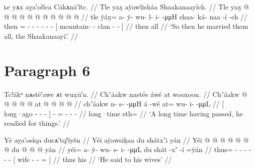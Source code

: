 \ex\label{ex:92-122-married-them-all}%
%
\begingl
	\glpreamble	ʟe yᴀx aỵa′ołîca Cākᴀnā′îtc. //
	\glpreamble	Tle yax̱ aÿawlisháa Shaakanaayích. //
	\gla	Tle yax̱ @  @ {} @ {} @ {} @ {} @ {} @ {}
		{}  @ {} @ {} @ {} @ {} {} //
	\glb	tle ÿáx̱= a- ÿ- wu- l- i-  -μμH
		{} shaa- ká- naa -í -ch {} //
	\glc	then = - - - - -
			 -
		{}[ mountain- - clan - - {}] //
	\gld	then all  {} {} {} {} {} {}
		{}  {} {} {} {} {} //
	\glft	‘So then he married them all, the Shaakanaayí.’
		//
\endgl
\xe

\section{Paragraph 6}\label{sec:92-para-6}

\ex\label{ex:92-123-ready-for-things}%
%
\begingl
	\glpreamble	Tc!ākᵘ nᴀstē′awe ᴀt wux̣ū′n. //
	\glpreamble	Chʼáakw nastée áwé at wooxoon. //
	\gla	{} Chʼáakw  @ {} @ {} @ {} @ {} {}  @ {}
		at @  @ {} @ {} @ {} //
	\glb	{} chʼáakw n- s-  -μμH {} {} á -wé
		at= wu- i-  -μμL //
	\glc	{}[ long·ago - -  - \· {}]
		 -
		= - -  - //
	\gld	{} long·time  {} {} {} {} {}
		 {} 
 		sth=  {} {} {} //
	\glft	‘A long time having passed, he readied for things.’
		//
\endgl
\xe


\ex\label{ex:92-124-said-to-wives}%
%
\begingl
	\glpreamble	Yē aỵa′osîqa ducᴀ′tq!îyên //
	\glpreamble	Yéi aÿawsiḵaa du shátxʼi yán //
	\gla	Yéi @  @ {} @ {} @ {} @ {} @ {} @ {}
		{} du  @ {} @ {} @ \•yán {} //
	\glb	yéi= a- ÿ- wu- s- i-  -μμL
		{} du shát -xʼ -í =ÿán {} //
	\glc	thus= - - - - -  -
		{}[  wife - - = {}] //
	\gld	thus  {} {} {} {} {} {}
		{} his  {} {} {} {} //
	\glft	‘He said to his wives’
		//
\endgl
\xe

